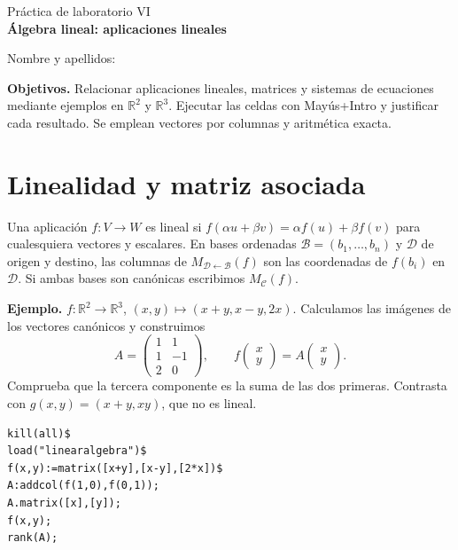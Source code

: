 \documentclass[12pt,a4paper]{article}
\begin{document}
\begin{center}{\large Práctica de laboratorio VI}\\[5pt]{\LARGE\bfseries\color{azul} Álgebra lineal: aplicaciones lineales}\end{center}
\noindent Nombre y apellidos: \hrulefill\par\medskip
\noindent\textbf{Objetivos.} Relacionar aplicaciones lineales, matrices y sistemas de ecuaciones mediante ejemplos en $\mathbb R^2$ y $\mathbb R^3$. Ejecutar las celdas con Mayús+Intro y justificar cada resultado. Se emplean vectores por columnas y aritmética exacta.
\section{Linealidad y matriz asociada}
Una aplicación $f:V\to W$ es lineal si $f(\alpha u+\beta v)=\alpha f(u)+\beta f(v)$ para cualesquiera vectores y escalares. En bases ordenadas $\mathcal B=(b_1,\ldots,b_n)$ y $\mathcal D$ de origen y destino, las columnas de $M_{\mathcal D\leftarrow\mathcal B}(f)$ son las coordenadas de $f(b_i)$ en $\mathcal D$. Si ambas bases son canónicas escribimos $M_{\mathcal C}(f)$.

\textbf{Ejemplo.} $f:\mathbb R^2\to\mathbb R^3$, $(x,y)\mapsto(x+y,x-y,2x)$. Calculamos las imágenes de los vectores canónicos y construimos
\[A=\begin{pmatrix}1&1\\1&-1\\2&0\end{pmatrix},\qquad f\begin{pmatrix}x\\y\end{pmatrix}=A\begin{pmatrix}x\\y\end{pmatrix}.\]
Comprueba que la tercera componente es la suma de las dos primeras. Contrasta con $g(x,y)=(x+y,xy)$, que no es lineal.
\begin{lstlisting}
kill(all)$
load("linearalgebra")$
f(x,y):=matrix([x+y],[x-y],[2*x])$
A:addcol(f(1,0),f(0,1));
A.matrix([x],[y]);
f(x,y);
rank(A);
\end{lstlisting}
\end{document}
